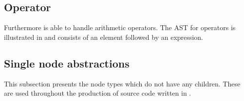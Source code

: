 %

\subsection{Operator}%

Furthermore \productname{} is able to handle arithmetic operators. The AST for operators is illustrated in  and consists of an element followed by an expression.%

%


\subsection{Single node abstractions}
This subsection presents the node types which do not have any children. These are used throughout the production of source code written in \productname{}.



%
%
%




